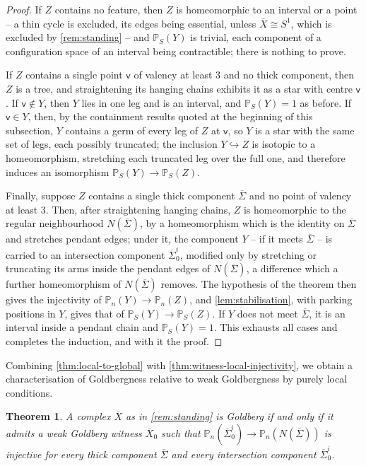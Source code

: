 \documentclass[reqno]{amsart}
\newtheorem{theorem}{Theorem}[section]
\theoremstyle{definition}
\newcommand\sfv{\mathsf{v}}
\newcommand{\PB}{\mathbb{P}}
\renewcommand{\bar}{\overline}
\numberwithin{equation}{section}
\begin{document}
\begin{proof}
If \(Z\) contains no feature, then \(Z\) is homeomorphic to an
interval or a point -- a thin cycle is excluded, its edges
being essential, unless \(\bar X\cong S^1\), which is excluded
by \cref{rem:standing} -- and \(\PB_S(Y)\) is trivial, each
component of a configuration space of an interval being
contractible; there is nothing to prove.

If \(Z\) contains a single point \(\sfv\) of valency at least
\(3\) and no thick component, then \(Z\) is a tree, and
straightening its hanging chains exhibits it as a star with
centre \(\sfv\). If \(\sfv\notin Y\), then \(Y\) lies in one leg and
is an interval, and \(\PB_S(Y)=1\) as before. If \(\sfv\in Y\),
then, by the containment results quoted at the beginning of
this subsection, \(Y\) contains a germ of every leg of \(Z\) at
\(\sfv\), so \(Y\) is a star with the same set of legs, each
possibly truncated; the inclusion \(Y\hookrightarrow Z\) is
isotopic to a homeomorphism, stretching each truncated leg over
the full one, and therefore induces an isomorphism
\(\PB_S(Y)\to\PB_S(Z)\).

Finally, suppose \(Z\) contains a single thick component
\(\bar\Sigma\) and no point of valency at least \(3\). Then,
after straightening hanging chains, \(Z\) is homeomorphic to
the regular neighbourhood \(N(\bar\Sigma)\), by a
homeomorphism which is the identity on \(\bar\Sigma\) and
stretches pendant edges; under it, the component \(Y\) -- if it
meets \(\bar\Sigma\) -- is carried to an intersection component
\(\bar\Sigma_0^i\), modified only by stretching or truncating
its arms inside the pendant edges of \(N(\bar\Sigma)\), a
difference which a further homeomorphism of \(N(\bar\Sigma)\)
removes. The hypothesis of the theorem then gives the
injectivity of \(\PB_n(Y)\to\PB_n(Z)\), and
\cref{lem:stabilisation}, with parking positions in \(Y\),
gives that of \(\PB_S(Y)\to\PB_S(Z)\). If \(Y\) does not meet
\(\bar\Sigma\), it is an interval inside a pendant chain and
\(\PB_S(Y)=1\). This exhausts all cases and completes the
induction, and with it the proof.
\end{proof}

Combining \cref{thm:local-to-global} with
\cref{thm:witness-local-injectivity}, we obtain a
characterisation of Goldbergness relative to weak Goldbergness
by purely local conditions.

\begin{theorem}\label{cor:goldberg-char-local}
A complex \(\bar X\) as in \cref{rem:standing} is Goldberg if
and only if it admits a weak Goldberg witness \(\bar X_0\) such
that \(\PB_n(\bar\Sigma_0^i)\to\PB_n(N(\bar\Sigma))\) is
injective for every thick component \(\bar\Sigma\) and every
intersection component \(\bar\Sigma_0^i\).
\end{theorem}
\end{document}
